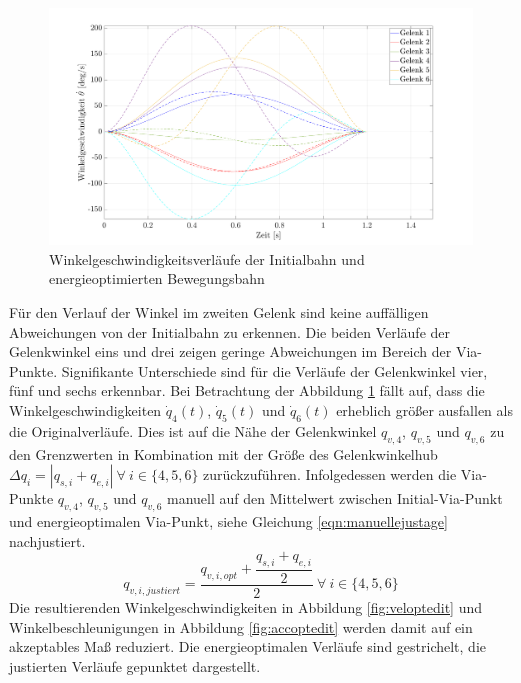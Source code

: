 %
\begin{figure}[tbph]
	\centering
	\includegraphics[width=1\linewidth]{images/Optimierungsergebnisse_up/velopt}
	\caption{Winkelgeschwindigkeitsverläufe der Initialbahn und energieoptimierten Bewegungsbahn}
	\label{fig:velopt}
\end{figure}
%
Für den Verlauf der Winkel im zweiten Gelenk sind keine auffälligen Abweichungen von der Initialbahn zu erkennen. Die beiden Verläufe der Gelenkwinkel eins und drei zeigen geringe Abweichungen im Bereich der Via-Punkte. Signifikante Unterschiede sind für die Verläufe der Gelenkwinkel vier, fünf und sechs erkennbar.  Bei Betrachtung der Abbildung \ref{fig:velopt} fällt auf, dass die Winkelgeschwindigkeiten $\dot{q}_{4}(t)$, $\dot{q}_{5}(t)$ und $\dot{q}_{6}(t)$ erheblich größer ausfallen als die Originalverläufe. Dies ist auf die Nähe der Gelenkwinkel ${q}_{v,4}$, ${q}_{v,5}$ und ${q}_{v,6}$ zu den Grenzwerten in Kombination mit der Größe des Gelenkwinkelhub $\Delta q_i = | q_{s,i}+q_{e,i} | ~\forall~ i \in \{4,5,6\}$ zurückzuführen. Infolgedessen werden die Via-Punkte ${q}_{v,4}$, ${q}_{v,5}$ und ${q}_{v,6}$ manuell auf den Mittelwert zwischen Initial-Via-Punkt und energieoptimalen Via-Punkt, siehe Gleichung \ref{eqn:manuellejustage} nachjustiert.
%
\begin{equation}
	\label{eqn:manuellejustage}
	{q}_{v,i,justiert} = \dfrac{{q}_{v,i,opt} + \dfrac{q_{s,i}+q_{e,i}}{2}}{2}~\forall~ i \in \{4,5,6\}
\end{equation}
%
Die resultierenden Winkelgeschwindigkeiten in Abbildung \ref{fig:veloptedit} und Winkelbeschleunigungen in Abbildung \ref{fig:accoptedit}  werden damit auf ein akzeptables Maß reduziert. Die energieoptimalen Verläufe sind gestrichelt, die justierten Verläufe gepunktet dargestellt.
%
